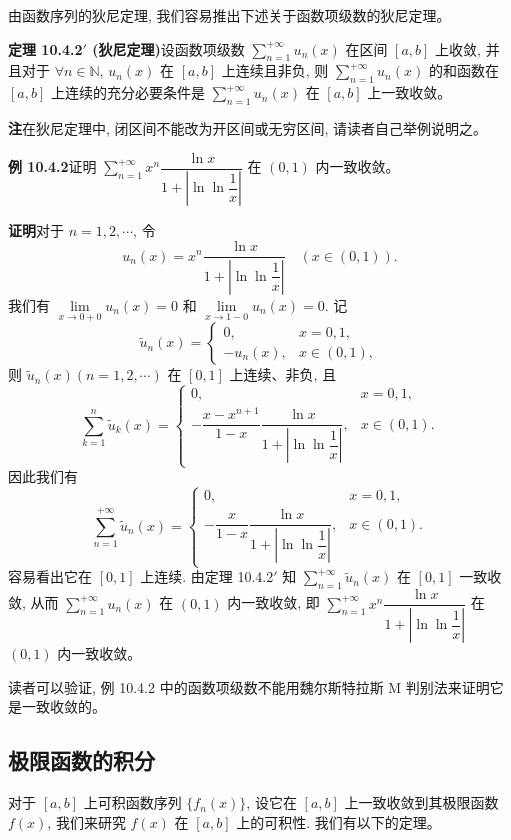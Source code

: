 \documentclass[UTF8,12pt,a4paper,fontset=fandol]{ctexart}
\begin{document}
由函数序列的狄尼定理, 我们容易推出下述关于函数项级数的狄尼定理。

\noindent\textbf{定理 10.4.2$'$ (狄尼定理)}\quad 设函数项级数 $\sum\limits_{n=1}^{+\infty}u_n(x)$ 在区间 $[a,b]$ 上收敛, 并且对于 $\forall n\in\mathbb N$, $u_n(x)$ 在 $[a,b]$ 上连续且非负, 则 $\sum\limits_{n=1}^{+\infty}u_n(x)$ 的和函数在 $[a,b]$ 上连续的充分必要条件是 $\sum\limits_{n=1}^{+\infty}u_n(x)$ 在 $[a,b]$ 上一致收敛。

\noindent\textbf{注}\quad 在狄尼定理中, 闭区间不能改为开区间或无穷区间, 请读者自己举例说明之。

\noindent\textbf{例 10.4.2}\quad 证明 $\sum\limits_{n=1}^{+\infty}x^n\dfrac{\ln x}{1+\left|\ln\ln\dfrac1x\right|}$ 在 $(0,1)$ 内一致收敛。

\noindent\textbf{证明}\quad 对于 $n=1,2,\cdots$, 令
\[
  u_n(x)=x^n\frac{\ln x}{1+\left|\ln\ln\dfrac1x\right|}\quad(x\in(0,1)).
\]
我们有 $\lim\limits_{x\to0+0}u_n(x)=0$ 和 $\lim\limits_{x\to1-0}u_n(x)=0$. 记
\[
  \widetilde u_n(x)=
  \begin{cases}
    0, & x=0,1,\\
    -u_n(x), & x\in(0,1),
  \end{cases}
\]
则 $\widetilde u_n(x)(n=1,2,\cdots)$ 在 $[0,1]$ 上连续、非负, 且
\[
  \sum_{k=1}^n\widetilde u_k(x)=
  \begin{cases}
    0, & x=0,1,\\
    -\dfrac{x-x^{n+1}}{1-x}\dfrac{\ln x}{1+\left|\ln\ln\dfrac1x\right|}, & x\in(0,1).
  \end{cases}
\]
因此我们有
\[
  \sum_{n=1}^{+\infty}\widetilde u_n(x)=
  \begin{cases}
    0, & x=0,1,\\
    -\dfrac{x}{1-x}\dfrac{\ln x}{1+\left|\ln\ln\dfrac1x\right|}, & x\in(0,1).
  \end{cases}
\]
容易看出它在 $[0,1]$ 上连续. 由定理 10.4.2$'$ 知 $\sum\limits_{n=1}^{+\infty}\widetilde u_n(x)$ 在 $[0,1]$ 一致收敛, 从而 $\sum\limits_{n=1}^{+\infty}u_n(x)$ 在 $(0,1)$ 内一致收敛, 即 $\sum\limits_{n=1}^{+\infty}x^n\dfrac{\ln x}{1+\left|\ln\ln\dfrac1x\right|}$ 在 $(0,1)$ 内一致收敛。

读者可以验证, 例 10.4.2 中的函数项级数不能用魏尔斯特拉斯 M 判别法来证明它是一致收敛的。

\subsection{极限函数的积分}

对于 $[a,b]$ 上可积函数序列 $\{f_n(x)\}$, 设它在 $[a,b]$ 上一致收敛到其极限函数 $f(x)$, 我们来研究 $f(x)$ 在 $[a,b]$ 上的可积性. 我们有以下的定理。
\end{document}
